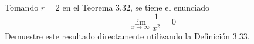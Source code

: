 \item Tomando $r = 2$ en el Teorema 3.32, se tiene el enunciado
    $$\lim_{x \to \infty} \frac{1}{x^2} = 0$$
    Demuestre este resultado directamente utilizando la Definición 3.33.
